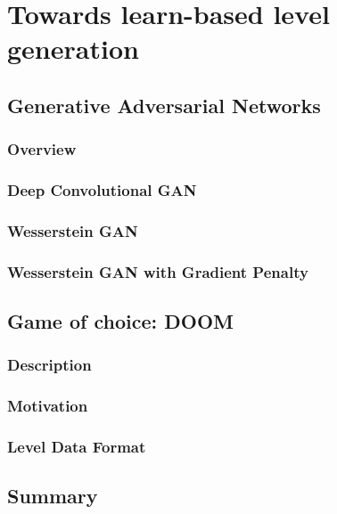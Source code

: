\chapter{Towards learn-based level generation}
\section{Generative Adversarial Networks}
\subsection{Overview}
\subsection{Deep Convolutional GAN}
\subsection{Wesserstein GAN}
\subsection{Wesserstein GAN with Gradient Penalty}


\section{Game of choice: DOOM}
\subsection{Description}
\subsection{Motivation}
\subsection{Level Data Format}

\section{Summary}
